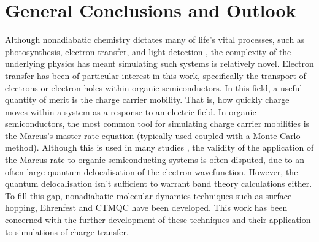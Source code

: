 \chapter{General Conclusions and Outlook}
\label{chap:outlook}
Although nonadiabatic chemistry dictates many of life's vital processes, such as photosynthesis, electron transfer, and light detection \cite{Dral2018}, the complexity of the underlying physics has meant simulating such systems is relatively novel. Electron transfer has been of particular interest in this work, specifically the transport of electrons or electron-holes within organic semiconductors. In this field, a useful quantity of merit is the charge carrier mobility. That is, how quickly charge moves within a system as a response to an electric field. In organic semiconductors, the most common tool for simulating charge carrier mobilities is the Marcus's master rate equation (typically used coupled with a Monte-Carlo method). Although this is used in many studies \cite{Marcus1, Marcus2, Marcus3, Marcus4, Marcus5, Marcus6, Marcus7, Marcus8}, the validity of the application of the Marcus rate to organic semiconducting systems is often disputed, due to an often large quantum delocalisation of the electron wavefunction. However, the quantum delocalisation isn't sufficient to warrant band theory calculations either. To fill this gap, nonadiabatic molecular dynamics techniques such as surface hopping, Ehrenfest and CTMQC have been developed. This work has been concerned with the further development of these techniques and their application to simulations of charge transfer.
\\\\
